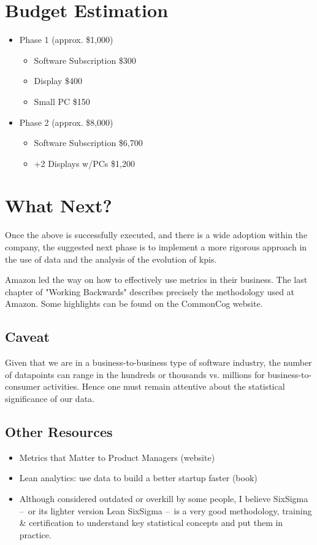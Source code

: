 \documentclass{tufte-handout}
\begin{document}
\section{Budget Estimation}\label{sec:budget}
\begin{itemize}
  \item Phase 1 (approx. \$1,000)
  \begin{itemize}
    \item Software Subscription \$300
    \item Display \$400
    \item Small PC  \$150
  \end{itemize}

  \item Phase 2 (approx. \$8,000) 
  \begin{itemize}
    \item Software Subscription \$6,700
    \item +2 Displays w/PCs \$1,200
  \end{itemize}

\end{itemize}
\section{What Next?}\label{sec:what-next}
Once the above is successfully executed, and there is a wide adoption within the company, the suggested next phase is to implement a more rigorous approach in the use of data and the analysis of the evolution of \gls{kpi}s.
\par Amazon led the way on how to effectively use metrics in their business. The last chapter of "Working Backwards"\cite{Bryar2021} describes precisely the methodology used at Amazon. Some highlights can be found on the CommonCog website\cite{CommonCog2021}.
\subsection{Caveat}\label{sec:caveat}
Given that we are in a business-to-business type of software industry, the number of datapoints can range in the hundreds or thousands vs. millions for business-to-consumer activities. Hence one must remain attentive about the statistical significance of our data.
\subsection{Other Resources}\label{sec:resources}
\begin{itemize}
 \item Metrics that Matter to Product Managers (website)\cite{Holmes2017}
 \item Lean analytics: use data to build a better startup faster (book)\cite[+30pt]{croll_lean_2013}
 \item Although considered outdated or overkill by some people, I believe SixSigma – or its lighter version Lean SixSigma – is a very good methodology, training \& certification to understand key statistical concepts and put them in practice.
\end{itemize}
\end{document}
